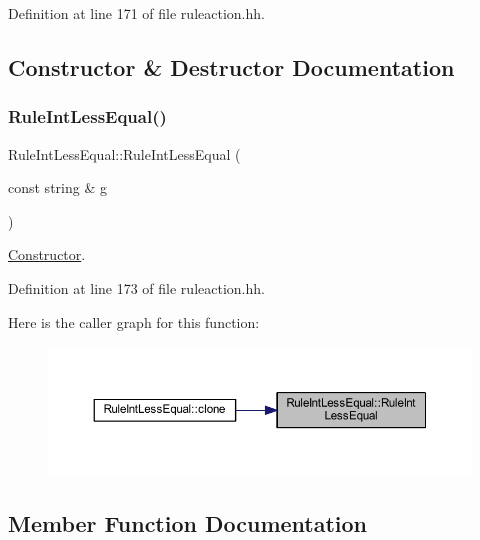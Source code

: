 Definition at line 171 of file ruleaction.\+hh.



\subsection{Constructor \& Destructor Documentation}
\mbox{\label{class_rule_int_less_equal_affb9c411f4c5f329b64131241a7ec1a1}} 
\subsubsection{\texorpdfstring{RuleIntLessEqual()}{RuleIntLessEqual()}}
{\footnotesize\ttfamily Rule\+Int\+Less\+Equal\+::\+Rule\+Int\+Less\+Equal (\begin{DoxyParamCaption}\item[{const string \&}]{g }\end{DoxyParamCaption})\hspace{0.3cm}{\ttfamily [inline]}}



\mbox{\hyperlink{class_constructor}{Constructor}}. 



Definition at line 173 of file ruleaction.\+hh.

Here is the caller graph for this function\+:
\nopagebreak
\begin{figure}[H]
\begin{center}
\leavevmode
\includegraphics[width=350pt]{class_rule_int_less_equal_affb9c411f4c5f329b64131241a7ec1a1_icgraph}
\end{center}
\end{figure}


\subsection{Member Function Documentation}
\mbox{\label{class_rule_int_less_equal_a94fea35e74d0c34edf0da67dd56cb8e6}} 

